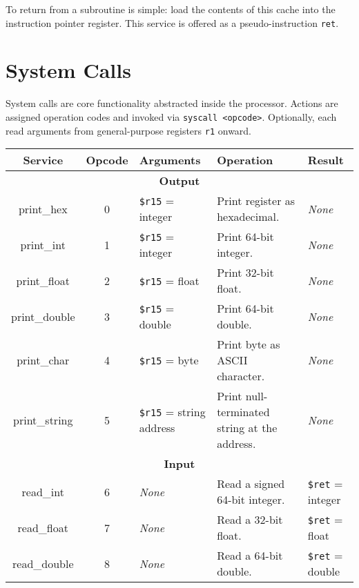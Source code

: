 \documentclass[10pt]{article}
\begin{document}
    To return from a subroutine is simple: load the contents of this cache into the instruction pointer register.
    This service is offered as a pseudo-instruction \texttt{ret}.

    \section{System Calls}\label{sec:system-call}

    System calls are core functionality abstracted inside the processor.
    Actions are assigned operation codes and invoked via \texttt{syscall <opcode>}.
    Optionally, each read arguments from general-purpose registers \texttt{r1} onward.

    \bigskip
    \begin{longtable}{|c|c|l|l|l|}
        \hline
        \textbf{Service} & \textbf{Opcode} & \textbf{Arguments} & \textbf{Operation} & \textbf{Result} \\
        \hline
        \multicolumn{5}{|c|}{\textbf{Output}} \\
        \hline
        print\_hex & 0 & \texttt{\$r15} = integer & Print register as hexadecimal. & \textit{None} \\
        \hline
        print\_int & 1 & \texttt{\$r15} = integer & Print 64-bit integer. & \textit{None} \\
        \hline
        print\_float & 2 & \texttt{\$r15} = float & Print 32-bit float. & \textit{None} \\
        \hline
        print\_double & 3 & \texttt{\$r15} = double & Print 64-bit double. & \textit{None} \\
        \hline
        print\_char & 4 & \texttt{\$r15} = byte & Print byte as ASCII character. & \textit{None} \\
        \hline
        print\_string & 5 & \texttt{\$r15} = string address & Print null-terminated string at the address. & \textit{None} \\
        \hline \hline
        \multicolumn{5}{|c|}{\textbf{Input}} \\
        \hline
        read\_int & 6 & \textit{None} & Read a signed 64-bit integer. & \texttt{\$ret} = integer \\
        \hline
        read\_float & 7 & \textit{None} & Read a 32-bit float. & \texttt{\$ret} = float \\
        \hline
        read\_double & 8 & \textit{None} & Read a 64-bit double. & \texttt{\$ret} = double \\

\end{longtable}
\end{document}
